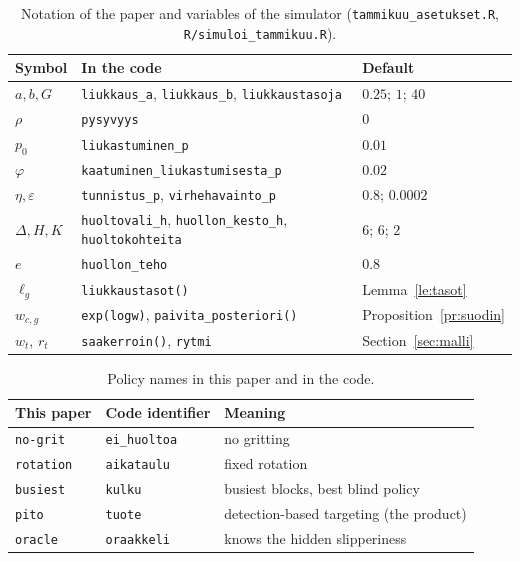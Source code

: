 \documentclass[11pt,a4paper]{article}
\theoremstyle{plain}
\theoremstyle{definition}
\theoremstyle{remark}
\newcommand{\1}{\mathbf{1}}
\newcommand{\pol}[1]{\texttt{#1}}
\begin{document}
\begin{table}[ht]
\centering
\small
\begin{tabular}{@{}lll@{}}
\toprule
Symbol & In the code & Default \\
\midrule
$a, b, G$ & \texttt{liukkaus\_a}, \texttt{liukkaus\_b}, \texttt{liukkaustasoja} & $0.25$; $1$; $40$ \\
$\rho$ & \texttt{pysyvyys} & $0$ \\
$p_0$ & \texttt{liukastuminen\_p} & $0.01$ \\
$\varphi$ & \texttt{kaatuminen\_liukastumisesta\_p} & $0.02$ \\
$\eta, \varepsilon$ & \texttt{tunnistus\_p}, \texttt{virhehavainto\_p} & $0.8$; $0.0002$ \\
$\Delta, H, K$ & \texttt{huoltovali\_h}, \texttt{huollon\_kesto\_h}, \texttt{huoltokohteita} & $6$; $6$; $2$ \\
$e$ & \texttt{huollon\_teho} & $0.8$ \\
$\ell_g$ & \texttt{liukkaustasot()} & Lemma~\ref{le:tasot} \\
$w_{c,g}$ & \texttt{exp(logw)}, \texttt{paivita\_posteriori()} & Proposition~\ref{pr:suodin} \\
$w_t$, $r_t$ & \texttt{saakerroin()}, \texttt{rytmi} & Section~\ref{sec:malli} \\
\bottomrule
\end{tabular}
\caption{Notation of the paper and variables of the simulator
(\texttt{tammikuu\_asetukset.R}, \texttt{R/simuloi\_tammikuu.R}).}
\label{tab:parametrit}
\end{table}

\begin{table}[ht]
\centering
\small
\begin{tabular}{@{}lll@{}}
\toprule
This paper & Code identifier & Meaning \\
\midrule
\pol{no-grit} & \texttt{ei\_huoltoa} & no gritting \\
\pol{rotation} & \texttt{aikataulu} & fixed rotation \\
\pol{busiest} & \texttt{kulku} & busiest blocks, best blind policy \\
\pol{pito} & \texttt{tuote} & detection-based targeting (the product) \\
\pol{oracle} & \texttt{oraakkeli} & knows the hidden slipperiness \\
\bottomrule
\end{tabular}
\caption{Policy names in this paper and in the code.}
\label{tab:politiikat}
\end{table}
\end{document}
